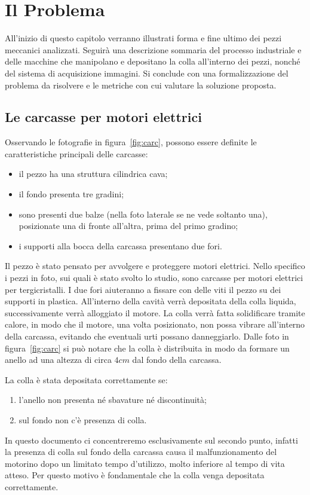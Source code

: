 
\chapter{Il Problema}
All'inizio di questo capitolo verranno illustrati forma e fine ultimo dei pezzi meccanici analizzati.
Seguirà una descrizione sommaria del processo industriale e delle macchine che manipolano e depositano la colla all'interno dei pezzi, nonché del sistema di acquisizione immagini.
Si conclude con una formalizzazione del problema da risolvere e le metriche con cui valutare la soluzione proposta.

\section{Le carcasse per motori elettrici}

Osservando le fotografie in figura~\ref{fig:carc}, possono essere definite le caratteristiche principali delle carcasse:
\begin{itemize}
  \item il pezzo ha una struttura cilindrica cava;
  \item il fondo presenta tre gradini;
  \item sono presenti due balze (nella foto laterale se ne vede soltanto una), posizionate una di fronte all'altra, prima del primo gradino;
  \item i supporti alla bocca della carcassa presentano due fori.
\end{itemize}
Il pezzo è stato pensato per avvolgere e proteggere motori elettrici.
Nello specifico i pezzi in foto, sui quali è stato svolto lo studio, sono carcasse per motori elettrici per tergicristalli.
I due fori aiuteranno a fissare con delle viti il pezzo su dei supporti in plastica.
All'interno della cavità verrà depositata della colla liquida, successivamente verrà alloggiato il motore.
La colla verrà fatta solidificare tramite calore, in modo che il motore, una volta posizionato, non possa vibrare all'interno della carcassa, evitando che eventuali urti possano danneggiarlo.
Dalle foto in figura~\ref{fig:carc} si può notare che la colla è distribuita in modo da formare un anello ad una altezza di circa $4cm$ dal fondo della carcassa.

La colla è stata depositata correttamente se:
\begin{enumerate}
  \item l'anello non presenta né sbavature né discontinuità;
  \item sul fondo non c'è presenza di colla.
\end{enumerate}
In questo documento ci concentreremo esclusivamente sul secondo punto, infatti la presenza di colla sul fondo della carcassa causa il malfunzionamento del motorino dopo un limitato tempo d'utilizzo, molto inferiore al tempo di vita atteso.
Per questo motivo è fondamentale che la colla venga depositata correttamente.

